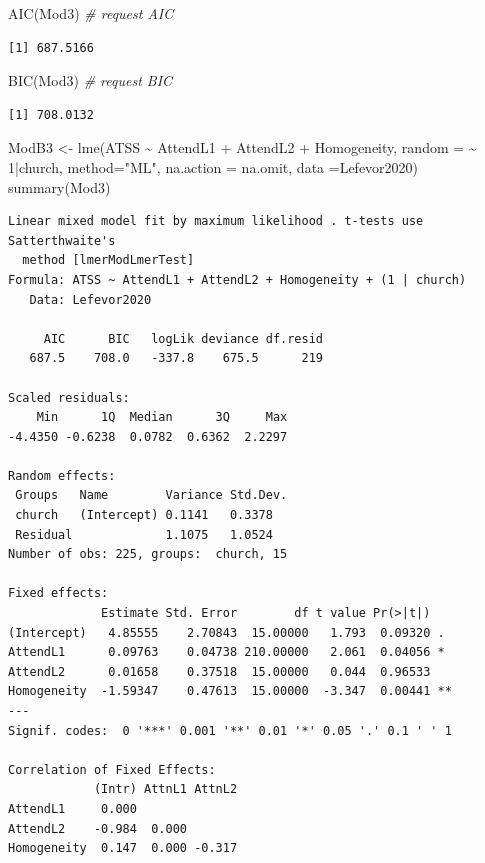 \documentclass[
  11pt,
]{book}
\newenvironment{Shaded}{\begin{snugshade}}{\end{snugshade}}
\newcommand{\AttributeTok}[1]{\textcolor[rgb]{0.77,0.63,0.00}{#1}}
\newcommand{\CommentTok}[1]{\textcolor[rgb]{0.56,0.35,0.01}{\textit{#1}}}
\newcommand{\DecValTok}[1]{\textcolor[rgb]{0.00,0.00,0.81}{#1}}
\newcommand{\FunctionTok}[1]{\textcolor[rgb]{0.00,0.00,0.00}{#1}}
\newcommand{\NormalTok}[1]{#1}
\newcommand{\OtherTok}[1]{\textcolor[rgb]{0.56,0.35,0.01}{#1}}
\newcommand{\SpecialCharTok}[1]{\textcolor[rgb]{0.00,0.00,0.00}{#1}}
\newcommand{\StringTok}[1]{\textcolor[rgb]{0.31,0.60,0.02}{#1}}
\begin{document}
\begin{Shaded}
\begin{Highlighting}[]
\FunctionTok{AIC}\NormalTok{(Mod3) }\CommentTok{\# request AIC}
\end{Highlighting}
\end{Shaded}

\begin{verbatim}
[1] 687.5166
\end{verbatim}

\begin{Shaded}
\begin{Highlighting}[]
\FunctionTok{BIC}\NormalTok{(Mod3) }\CommentTok{\# request BIC}
\end{Highlighting}
\end{Shaded}

\begin{verbatim}
[1] 708.0132
\end{verbatim}

\begin{Shaded}
\begin{Highlighting}[]
\NormalTok{ModB3 }\OtherTok{\textless{}{-}} \FunctionTok{lme}\NormalTok{(ATSS }\SpecialCharTok{\textasciitilde{}}\NormalTok{  AttendL1 }\SpecialCharTok{+}\NormalTok{  AttendL2 }\SpecialCharTok{+}\NormalTok{ Homogeneity, }\AttributeTok{random =} \SpecialCharTok{\textasciitilde{}} \DecValTok{1}\SpecialCharTok{|}\NormalTok{church, }\AttributeTok{method=}\StringTok{"ML"}\NormalTok{, }\AttributeTok{na.action =}\NormalTok{ na.omit, }\AttributeTok{data =}\NormalTok{Lefevor2020)}
\FunctionTok{summary}\NormalTok{(Mod3)}
\end{Highlighting}
\end{Shaded}

\begin{verbatim}
Linear mixed model fit by maximum likelihood . t-tests use Satterthwaite's
  method [lmerModLmerTest]
Formula: ATSS ~ AttendL1 + AttendL2 + Homogeneity + (1 | church)
   Data: Lefevor2020

     AIC      BIC   logLik deviance df.resid 
   687.5    708.0   -337.8    675.5      219 

Scaled residuals: 
    Min      1Q  Median      3Q     Max 
-4.4350 -0.6238  0.0782  0.6362  2.2297 

Random effects:
 Groups   Name        Variance Std.Dev.
 church   (Intercept) 0.1141   0.3378  
 Residual             1.1075   1.0524  
Number of obs: 225, groups:  church, 15

Fixed effects:
             Estimate Std. Error        df t value Pr(>|t|)   
(Intercept)   4.85555    2.70843  15.00000   1.793  0.09320 . 
AttendL1      0.09763    0.04738 210.00000   2.061  0.04056 * 
AttendL2      0.01658    0.37518  15.00000   0.044  0.96533   
Homogeneity  -1.59347    0.47613  15.00000  -3.347  0.00441 **
---
Signif. codes:  0 '***' 0.001 '**' 0.01 '*' 0.05 '.' 0.1 ' ' 1

Correlation of Fixed Effects:
            (Intr) AttnL1 AttnL2
AttendL1     0.000              
AttendL2    -0.984  0.000       
Homogeneity  0.147  0.000 -0.317
\end{verbatim}
\end{document}
